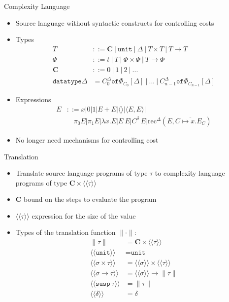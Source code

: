 \documentclass[pdf]{beamer}
\newcommand{\T}[1]{\texttt{#1}}
\newcommand{\LP}{\langle}
\newcommand{\RP}{\rangle}
\newcommand{\LL}{\langle\!\langle}
\newcommand{\RR}{\rangle\!\rangle}
\begin{document}
\begin{frame}{Complexity Language}
  \begin{itemize}
    \item Source language without syntactic constructs for controlling costs
    \item Types
      \begin{align*}
        T &::= \textbf{C} \ |\ \T{unit} \ |\ \Delta \ |\ T \times T \ |\ T \rightarrow T \\
        \Phi &::= t \ |\ T \ |\ \Phi \times \Phi \ |\ T \rightarrow \Phi \\
        \textbf{C} &::= 0\ |\ 1\ |\ 2\ |\ ... \\
        \T{datatype}\Delta &= C^\Delta_0 \T{of} \Phi_{C_0}[\Delta] \ |\ ... \ |\ C^\Delta_{n-1} \T{of} \Phi_{C_{n-1}}[\Delta]
      \end{align*}
    \item Expressions
      \begin{align*}
        E &::= x | 0 | 1 | E + E | \LP\RP | \LP E,E \RP | \\
          &\quad \pi_0 E | \pi_1 E | \lambda x.E | E\ E | C^\delta\ E | \text{rec}^\Delta(E, \overline{C \mapsto x.E_C})
      \end{align*}
    \vfill
    \item No longer need mechanisms for controlling cost
  \end{itemize}
\end{frame}

\begin{frame}{Translation}
  \begin{itemize}
    \item Translate source language programs of type $\tau$ to complexity language programs of type $\textbf{C}\times \LL \tau \RR$
    \vfill
    \item \textbf{C} bound on the steps to evaluate the program
    \vfill
    \item $\LL\tau\RR$ expression for the size of the value
    \vfill
    \item Types of the translation function $\|\cdot\|$:
      \begin{align*}
        \|\tau\| &= \textbf{C} \times \LL \tau \RR \\
        \LL\T{unit}\RR &= \T{unit} \\
        \LL \sigma \times \tau \RR &= \LL \sigma \RR \times \LL \tau \RR \\
        \LL \sigma \rightarrow \tau \RR &= \LL \sigma \RR \rightarrow \|\tau\| \\
        \LL \T{susp}\ \tau \RR &= \|\tau\| \\
        \LL \delta \RR &= \delta \\
      \end{align*}
  \end{itemize}
\end{frame}
\end{document}
